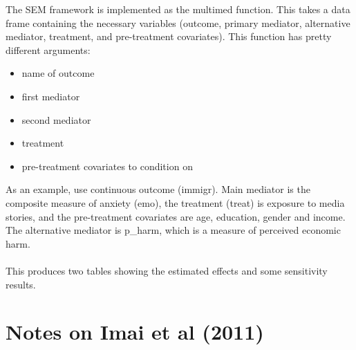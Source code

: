 \documentclass{article}
\begin{document}
	The SEM framework is implemented as the multimed function. This takes a data frame containing the necessary variables (outcome, primary mediator, alternative mediator, treatment, and pre-treatment covariates). This function has pretty different arguments:
	\begin{itemize}
		\item name of outcome 
		\item first mediator
		\item second mediator
		\item treatment
		\item pre-treatment covariates to condition on
	\end{itemize}
	As an example, use continuous outcome (immigr). Main mediator is the composite measure of anxiety (emo), the treatment (treat) is exposure to media stories, and the pre-treatment covariates are age, education, gender and income. The alternative mediator is p\_harm, which is a measure of perceived economic harm. 
	\\~\\
	This produces two tables showing the estimated effects and some sensitivity results. 
	
	
	
	\section{Notes on Imai et al (2011)}
	
\end{document}
